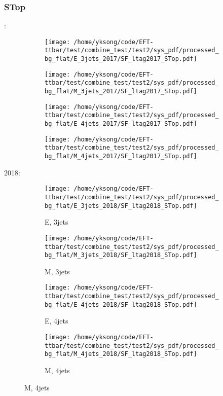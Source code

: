 \documentclass{beamer}
\begin{document}
\begin{frame}
\frametitle{STop}
\fontsize{5}{1}:
\begin{figure}
\centering
\begin{subfigure}[b]{0.24\textwidth}
\texttt{[image: /home/yksong/code/EFT-ttbar/test/combine\_test/test2/sys\_pdf/processed\_bg\_flat/E\_3jets\_2017/SF\_ltag2017\_STop.pdf]}
\end{subfigure}
\begin{subfigure}[b]{0.24\textwidth}
\texttt{[image: /home/yksong/code/EFT-ttbar/test/combine\_test/test2/sys\_pdf/processed\_bg\_flat/M\_3jets\_2017/SF\_ltag2017\_STop.pdf]}
\end{subfigure}
\begin{subfigure}[b]{0.24\textwidth}
\texttt{[image: /home/yksong/code/EFT-ttbar/test/combine\_test/test2/sys\_pdf/processed\_bg\_flat/E\_4jets\_2017/SF\_ltag2017\_STop.pdf]}
\end{subfigure}
\begin{subfigure}[b]{0.24\textwidth}
\texttt{[image: /home/yksong/code/EFT-ttbar/test/combine\_test/test2/sys\_pdf/processed\_bg\_flat/M\_4jets\_2017/SF\_ltag2017\_STop.pdf]}
\end{subfigure}
\end{figure}
2018:
\begin{figure}
\centering
\begin{subfigure}[b]{0.24\textwidth}
\texttt{[image: /home/yksong/code/EFT-ttbar/test/combine\_test/test2/sys\_pdf/processed\_bg\_flat/E\_3jets\_2018/SF\_ltag2018\_STop.pdf]}
\captionsetup{font=tiny}
\caption{E, 3jets}
\end{subfigure}
\begin{subfigure}[b]{0.24\textwidth}
\texttt{[image: /home/yksong/code/EFT-ttbar/test/combine\_test/test2/sys\_pdf/processed\_bg\_flat/M\_3jets\_2018/SF\_ltag2018\_STop.pdf]}
\captionsetup{font=tiny}
\caption{M, 3jets}
\end{subfigure}
\begin{subfigure}[b]{0.24\textwidth}
\texttt{[image: /home/yksong/code/EFT-ttbar/test/combine\_test/test2/sys\_pdf/processed\_bg\_flat/E\_4jets\_2018/SF\_ltag2018\_STop.pdf]}
\captionsetup{font=tiny}
\caption{E, 4jets}
\end{subfigure}
\begin{subfigure}[b]{0.24\textwidth}
\texttt{[image: /home/yksong/code/EFT-ttbar/test/combine\_test/test2/sys\_pdf/processed\_bg\_flat/M\_4jets\_2018/SF\_ltag2018\_STop.pdf]}
\captionsetup{font=tiny}
\caption{M, 4jets}
\end{subfigure}
\end{figure}
\end{frame}
\end{document}
